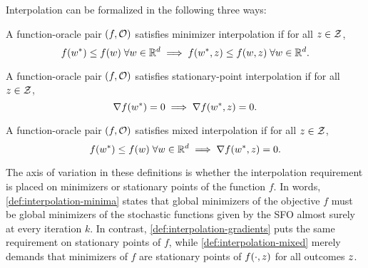 Interpolation can be formalized in the following three ways:
\begin{definition}\label{def:interpolation-minima}
    A function-oracle pair \( (f, \oracle{}) \) satisfies minimizer interpolation if for all \( \z \in \calZ \),
    \[ f(\wopt) \leq f(\w) \; \forall \w \in \R^d \implies f(\wopt, \z) \leq f(\w, \z) \; \forall \w \in \R^d.  \]
\end{definition}
\begin{definition}\label{def:interpolation-gradients}
    A function-oracle pair \( (f, \oracle{}) \) satisfies stationary-point interpolation if for all \( \z \in \calZ \),
    \[ \grad(\wopt) = 0 \implies \grad(\wopt, \z) = 0. \]
\end{definition}
\begin{definition}\label{def:interpolation-mixed}
    A function-oracle pair \( (f, \oracle{}) \) satisfies mixed interpolation if for all \( \z \in \calZ \),
    \[ f(\wopt) \leq f(\w) \; \forall \w \in \R^d \implies \grad(\wopt, \z) = 0. \]
\end{definition}
The axis of variation in these definitions is whether the interpolation requirement is placed on minimizers or stationary points of the function \( f \).
In words, \autoref{def:interpolation-minima} states that global minimizers of the objective \( f \) must be global minimizers of the stochastic functions given by the SFO almost surely at every iteration \( k \).
In contrast, \autoref{def:interpolation-gradients} puts the same requirement on stationary points of \( f \), while \autoref{def:interpolation-mixed} merely demands that minimizers of \( f \) are stationary points of \( f(\cdot, \z) \) for all outcomes \( \z \).

